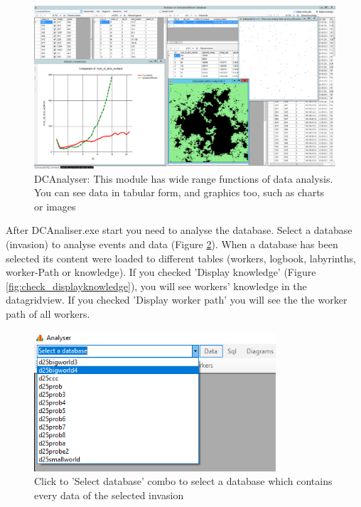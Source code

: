 \documentclass[a4paper,12pt]{article}
\begin{document}
\begin{figure}
	\begin{center}
		\includegraphics[width=15cm]{analyser1.png}
		\caption{DCAnalyser: This module has wide range functions of data analysis. You can see data in tabular form, and graphics too, such as charts or images}
		\label{fig:analyser}
	\end{center}
\end{figure}


After DCAnaliser.exe start you need to analyse the database. Select a database (invasion) to analyse events and data (Figure \ref{fig:dcaselect}). When a database has been selected its content were loaded to different tables (workers, logbook, labyrinths, worker-Path or knowledge). If you checked 'Display knowledge' (Figure \ref{fig:check_displayknowledge}), you will see workers' knowledge in the datagridview. If you checked 'Display worker path' you will see the the worker path of all workers.


\begin{figure}
	\begin{center}
		\includegraphics[width=9cm]{dcaselect.png}
		\caption{Click to 'Select database' combo to select a database which contains every data of the selected invasion}
		\label{fig:dcaselect}
	\end{center}
\end{figure}
\end{document}
